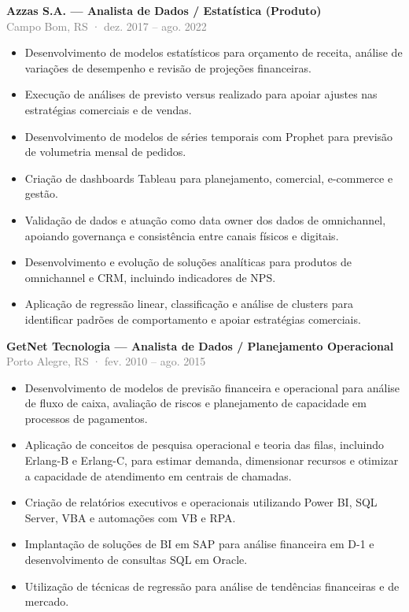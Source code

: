 \documentclass[10pt,a4paper]{article}
\newcommand{\role}[3]{%
  \Needspace{13\baselineskip}%
  \textbf{#1}\\[-1pt]
  {\small\textcolor{grey}{#2}}\\[-1pt]
  #3\par}
\begin{document}
\role{Azzas S.A. — Analista de Dados / Estatística (Produto)}{Campo Bom, RS · dez. 2017 – ago. 2022}{
\begin{itemize}
  \item Desenvolvimento de modelos estatísticos para orçamento de receita, análise de variações de desempenho e revisão de projeções financeiras.
  \item Execução de análises de previsto versus realizado para apoiar ajustes nas estratégias comerciais e de vendas.
  \item Desenvolvimento de modelos de séries temporais com Prophet para previsão de volumetria mensal de pedidos.
  \item Criação de dashboards Tableau para planejamento, comercial, e-commerce e gestão.
  \item Validação de dados e atuação como data owner dos dados de omnichannel, apoiando governança e consistência entre canais físicos e digitais.
  \item Desenvolvimento e evolução de soluções analíticas para produtos de omnichannel e CRM, incluindo indicadores de NPS.
  \item Aplicação de regressão linear, classificação e análise de clusters para identificar padrões de comportamento e apoiar estratégias comerciais.
\end{itemize}}

\role{GetNet Tecnologia — Analista de Dados / Planejamento Operacional}{Porto Alegre, RS · fev. 2010 – ago. 2015}{
\begin{itemize}
  \item Desenvolvimento de modelos de previsão financeira e operacional para análise de fluxo de caixa, avaliação de riscos e planejamento de capacidade em processos de pagamentos.
  \item Aplicação de conceitos de pesquisa operacional e teoria das filas, incluindo Erlang-B e Erlang-C, para estimar demanda, dimensionar recursos e otimizar a capacidade de atendimento em centrais de chamadas.
  \item Criação de relatórios executivos e operacionais utilizando Power BI, SQL Server, VBA e automações com VB e RPA.
  \item Implantação de soluções de BI em SAP para análise financeira em D-1 e desenvolvimento de consultas SQL em Oracle.
  \item Utilização de técnicas de regressão para análise de tendências financeiras e de mercado.
\end{itemize}}
\end{document}
